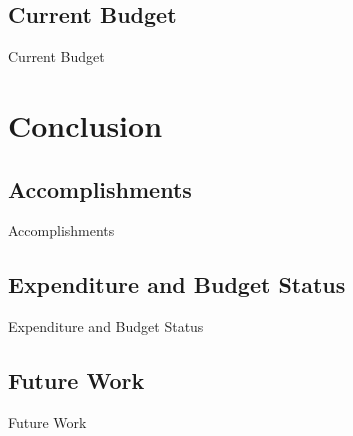 \documentclass[17pt, aspectratio=169]{beamer}
\begin{document}
\subsection{Current Budget}
\begin{frame}{Current Budget}

\end{frame}
\section{Conclusion}
\subsection{Accomplishments}
\begin{frame}{Accomplishments}

\end{frame}
\subsection{Expenditure and Budget Status}
\begin{frame}{Expenditure and Budget Status}

\end{frame}
\subsection{Future Work}
\begin{frame}{Future Work}

\end{frame}
\end{document}
